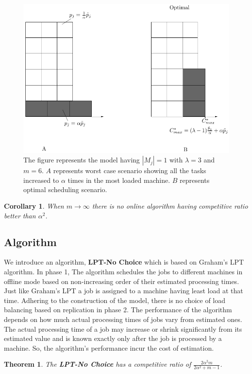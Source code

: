 \documentclass[10pt, conference, compsocconf]{IEEEtran}
\newtheorem{theorem}{Theorem}[section]
\newtheorem{corollary}{Corollary}[theorem]
\begin{document}
  
  \begin{figure}[htp]
  \centering
  \includegraphics[width= 8 cm]{model1.pdf}
  \caption{ The figure represents the model having $|M_j|= 1$ with
  $\lambda = 3$ and $m = 6$. $A$ represents worst case scenario showing all the tasks increased to $\alpha$ times in the most loaded machine. $B$ represents   optimal scheduling scenario.  }
  \label{fig:rara}
  \end{figure}
  \begin{corollary}
  When $m\rightarrow \infty$ there is no online algorithm having competitive ratio better than $\alpha^{2}$.
  \end{corollary}
  
\subsection{Algorithm}

We introduce an algorithm, \textbf{LPT-No Choice} which is based on Graham's LPT algorithm. In phase 1, The algorithm schedules the jobs to different machines in offline mode based on non-increasing order of their estimated processing times. Just like Graham's LPT a
job is assigned to a machine having least load at that time. Adhering to the construction of the model, there is no choice of load balancing based on replication in phase 2. The performance of the algorithm depends on how much actual processing times of jobs vary from estimated ones. The actual processing time of a job may
increase or shrink significantly from its estimated value and is known exactly only after the job is processed by a machine. So, the algorithm's performance incur the cost of estimation.

\begin{theorem}
The \textbf{LPT-No Choice} has a competitive ratio of $ \frac{2\alpha^{2}m}{2\alpha^{2}+ m-1}$.
\end{theorem} 
\end{document}
